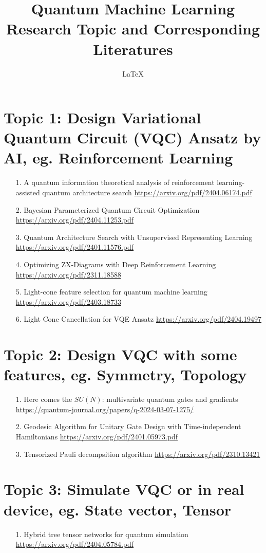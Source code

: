 \documentclass[12pt, oneside]{article}   	%
\title{Quantum Machine Learning Research Topic and Corresponding Literatures}
\author{\LaTeX}
\date{}							%
\begin{document}
\maketitle
\section{Topic 1: Design Variational Quantum Circuit (VQC) Ansatz by AI, eg. Reinforcement Learning}
\begin{itemize}
\item[1. ] A quantum information theoretical analysis of reinforcement	 learning-assisted quantum architecture search \url{https://arxiv.org/pdf/2404.06174.pdf}
\item[2. ] Bayesian Parameterized Quantum Circuit Optimization \url{https://arxiv.org/pdf/2404.11253.pdf}
\item[3. ] Quantum Architecture Search with Unsupervised Representing Learning \url{https://arxiv.org/pdf/2401.11576.pdf}
\item[4. ] Optimizing ZX-Diagrams with Deep Reinforcement Learning \url{https://arxiv.org/pdf/2311.18588} 
\item[5. ] Light-cone feature selection for quantum machine learning \url{https://arxiv.org/pdf/2403.18733} 
\item[6. ] Light Cone Cancellation for VQE Ansatz \url{https://arxiv.org/pdf/2404.19497} 
\end{itemize}



\section{Topic 2: Design VQC with some features, eg. Symmetry, Topology}
\begin{itemize}
\item[1. ] Here comes the $SU(N)$: multivariate quantum gates and gradients \url{https://quantum-journal.org/papers/q-2024-03-07-1275/}
\item [2. ]  Geodesic Algorithm for Unitary Gate Design with Time-independent Hamiltonians \url{https://arxiv.org/pdf/2401.05973.pdf}
\item [3. ] Tensorized Pauli decompsition algorithm \url{https://arxiv.org/pdf/2310.13421}
\end{itemize}

\section{Topic 3: Simulate VQC or in real device, eg. State vector, Tensor}
\begin{itemize}
\item[1.] Hybrid tree tensor networks for quantum simulation \url{https://arxiv.org/pdf/2404.05784.pdf}
\end{itemize}
\end{document}
